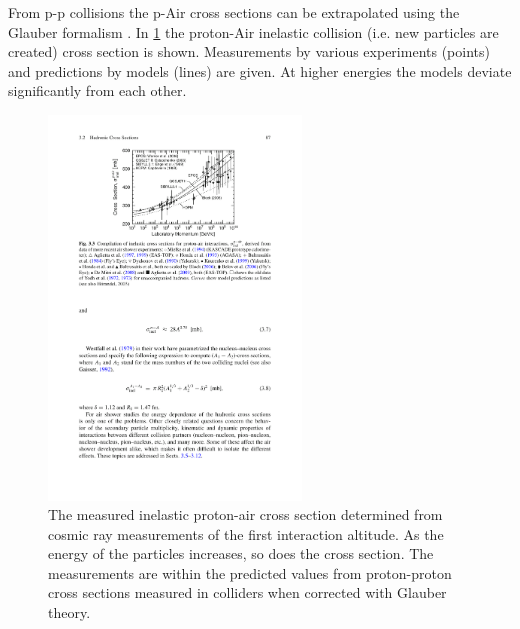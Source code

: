 From p-p collisions the p-Air cross sections can be extrapolated using the Glauber formalism \cite{glauber1955crosssections,abbasi2015crosssection}. In \cref{fig:pair_crosssection} the proton-Air inelastic collision (i.e. new particles are created) cross section is shown. Measurements by various experiments (points) and predictions by models (lines) are given. At higher energies the models deviate significantly from each other.

\begin{figure}
    \centering
    \includegraphics[width=0.6\textwidth]
                    {plots/cosmic-rays/pair_crosssection}
    \caption{The measured inelastic proton-air cross section determined from cosmic ray measurements of the first interaction altitude. As the energy of the particles increases, so does the cross section. The measurements are within the predicted values from proton-proton cross sections measured in colliders when corrected with Glauber theory.}
    \label{fig:pair_crosssection}
\end{figure}


